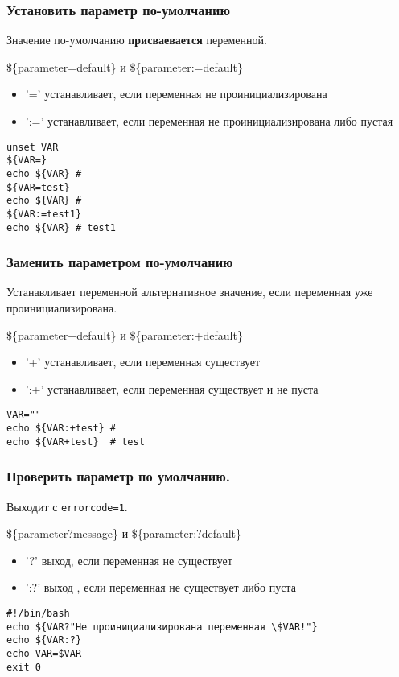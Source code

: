 \begin{frame}[fragile]
	\frametitle{Установить параметр по-умолчанию}

	Значение по-умолчанию {\bf присваевается} переменной. 

	\begin{block}{\$\{parameter=default\} и \$\{parameter:=default\}}
	\begin{itemize}
		\item '=' устанавливает, если переменная не проинициализирована
		\item ':=' устанавливает, если переменная не проинициализирована либо пустая
	\end{itemize}
	\begin{lstlisting}
unset VAR
${VAR=}
echo ${VAR} # 
${VAR=test}
echo ${VAR} # 
${VAR:=test1}
echo ${VAR} # test1
	\end{lstlisting}
	\end{block}

\end{frame}

\begin{frame}[fragile]
	\frametitle{Заменить параметром по-умолчанию}

	Устанавливает переменной альтернативное значение, если переменная уже проинициализирована.

	\begin{block}{\$\{parameter+default\} и \$\{parameter:+default\}}
	\begin{itemize}
		\item '+' устанавливает, если переменная существует
		\item ':+' устанавливает, если переменная существует и не пуста
	\end{itemize}
	\begin{lstlisting}
VAR=""
echo ${VAR:+test} # 
echo ${VAR+test}  # test
\end{lstlisting}
	\end{block}

\end{frame}


\begin{frame}[fragile]
	\frametitle{Проверить параметр по умолчанию.}

	Выходит с {\tt errorcode=1}.

	\begin{block}{\$\{parameter?message\} и \$\{parameter:?default\}}
	\begin{itemize}
		\item '?' выход, если переменная не существует
		\item ':?' выход , если переменная не существует либо пуста
	\end{itemize}

	\begin{lstlisting}
#!/bin/bash
echo ${VAR?"Не проинициализирована переменная \$VAR!"}
echo ${VAR:?}
echo VAR=$VAR
exit 0
	\end{lstlisting}
	\end{block}
\end{frame}

